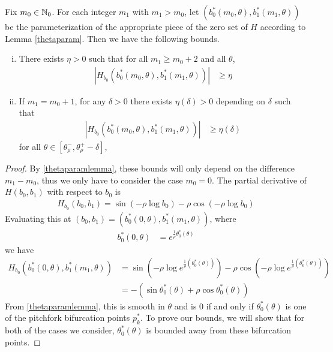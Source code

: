 \documentclass[thesis.tex]{subfiles}
\begin{document}
\begin{lemma}\label{Hderivboundslemma}
Fix $m_0 \in \mathbb{N}_0$. For each integer $m_1$ with $m_1 > m_0$, let $(b_0^*(m_0, \theta), b_1^*(m_1, \theta))$ be the parameterization of the appropriate piece of the zero set of $H$ according to Lemma \ref{thetaparam}. Then we have the following bounds.
\begin{enumerate}[(i)]
\item There exists $\eta > 0$ such that for all $m_1 \geq m_0 + 2$ and all $\theta$,
\begin{align}\label{Hderivbound}
| H_{b_0}(b_0^*(m_0, \theta), b_1^*(m_1, \theta)) | &\geq \eta
\end{align}
\item If $m_1 = m_0 + 1$, for any $\delta > 0$ there exists $\eta(\delta) > 0$ depending on $\delta$ such that
\begin{align}\label{Hderivbound2}
| H_{b_0}(b_0^*(m_0, \theta), b_1^*(m_1, \theta)) | &\geq \eta(\delta)
\end{align}
for all $\theta \in [\theta_\rho^-, \theta_\rho^+ - \delta]$,
\end{enumerate}

\begin{proof}
By \cref{thetaparamlemma}, these bounds will only depend on the difference $m_1 - m_0$, thus we only have to consider the case $m_0 = 0$. The partial derivative of $H(b_0, b_1)$ with respect to $b_0$ is
\begin{align}\label{Hb0}
H_{b_0} (b_0, b_1) = \sin(-\rho \log b_0) - \rho \cos(-\rho \log b_0)
\end{align}
Evaluating this at $(b_0, b_1) = (b_0^*(0, \theta), b_1^*(m_1, \theta))$, where
\begin{align}\label{b0starexp}
b_0^*(0, \theta) &= e^{\frac{1}{\rho} \theta_0^*(\theta) }
\end{align}
we have
\begin{align*}
H_{b_0}(b_0^*(0, \theta), b_1^*(m_1, \theta)) &= \sin\left(-\rho \log e^{\frac{1}{\rho}(\theta_0^*(\theta))} \right) - \rho \cos\left(-\rho \log e^{\frac{1}{\rho}(\theta_0^*(\theta))} \right) \\
&= -\left( \sin \theta_0^*(\theta) + \rho \cos \theta_0^*(\theta) \right)
\end{align*}
From \cref{thetaparamlemma}, this is smooth in $\theta$ and is 0 if and only if $\theta_0^*(\theta)$ is one of the pitchfork bifurcation points $p_k^*$. To prove our bounds, we will show that for both of the cases we consider, $\theta_0^*(\theta)$ is bounded away from these bifurcation points.  


\end{proof}
\end{lemma}
\end{document}
